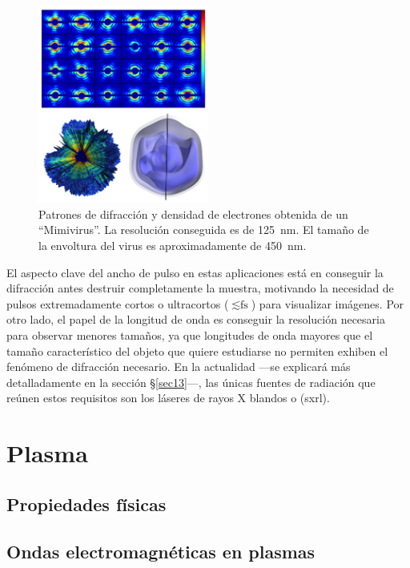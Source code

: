 \begin{figure}[ht!]
    \centering
    \includegraphics[width=0.5\textwidth]{Figuras/ch1_pulso.png}
    \caption{Patrones de difracción y densidad de electrones obtenida de un \enquote{Mimivirus}\autocite{Ekeberg2015Three-DimensionalLaser}. La resolución conseguida es de \qty{125}{\nm}. El tamaño de la envoltura del virus es aproximadamente de \qty{450}{\nm}.}
    \label{figch1_pulso}
\end{figure}

El aspecto clave del ancho de pulso en estas aplicaciones está en conseguir la difracción antes destruir completamente la muestra\autocite{Neutze2000PotentialPulses}, motivando la necesidad de pulsos extremadamente cortos o ultracortos ($\lesssim\unit{\fs}$) para visualizar imágenes. Por otro lado, el papel de la longitud de onda es conseguir la resolución necesaria para observar menores tamaños, ya que longitudes de onda mayores que el tamaño característico del objeto que quiere estudiarse no permiten exhiben el fenómeno de difracción necesario. En la actualidad ---se explicará más detalladamente en la sección \S\ref{sec13}---, las únicas fuentes de radiación que reúnen estos requisitos son los láseres de rayos X blandos o \emph{} (\acrshort{sxrl}).

\section{Plasma} \label{sec12}

\subsection{Propiedades físicas} \label{sec121}

\subsection{Ondas electromagnéticas en plasmas} \label{sec122}

